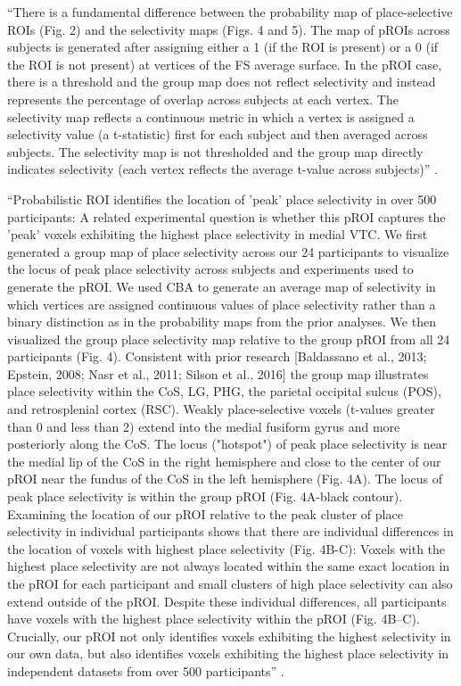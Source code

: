 ``There is a fundamental difference between the probability map of
place-selective ROIs (Fig. 2) and the selectivity maps (Figs.  4 and 5).
%
The map of pROIs across subjects is generated after assigning either a 1 (if the
ROI is present) or a 0 (if the ROI is not present) at vertices of the FS average
surface.
%
In the pROI case, there is a threshold and the group map does not reflect
selectivity and instead represents the percentage of overlap across subjects at
each vertex.
%
The selectivity map reflects a continuous metric in which a vertex is assigned a
selectivity value (a t-statistic) first for each subject and then averaged
across subjects.
%
The selectivity map is not thresholded and the group map directly indicates
selectivity (each vertex reflects the average t-value across subjects)''
\citep{weiner2018defining}.


``Probabilistic ROI identifies the location of 'peak' place selectivity in over
500 participants:
%
A related experimental question is whether this pROI captures the 'peak' voxels
exhibiting the highest place selectivity in medial VTC.
%
We first generated a group map of place selectivity across our 24 participants
to visualize the locus of peak place selectivity across subjects and experiments
used to generate the pROI.
%
We used CBA to generate an average map of selectivity in which vertices are
assigned continuous values of place selectivity rather than a binary distinction
as in the probability maps from the prior analyses.
%
We then visualized the group place selectivity map relative to the group pROI
from all 24 participants (Fig. 4).
%
Consistent with prior research [Baldassano et al., 2013; Epstein, 2008; Nasr et
al., 2011; Silson et al., 2016] the group map illustrates place selectivity
within the CoS, LG, PHG, the parietal occipital sulcus (POS), and retrosplenial
cortex (RSC).
%
Weakly place-selective voxels (t-values greater than 0 and less than 2) extend
into the medial fusiform gyrus and more posteriorly along the CoS.
%
The locus ("hotspot") of peak place selectivity is near the medial lip of the
CoS in the right hemisphere and close to the center of our pROI near the fundus
of the CoS in the left hemisphere (Fig. 4A).
%
The locus of peak place selectivity is within the group pROI (Fig. 4A-black
contour).
%
Examining the location of our pROI relative to the peak cluster of place
selectivity in individual participants shows that there are individual
differences in the location of voxels with highest place selectivity (Fig.
4B-C):
%
Voxels with the highest place selectivity are not always located within the same
exact location in the pROI for each participant and small clusters of high place
selectivity can also extend outside of the pROI.
%
Despite these individual differences, all participants have voxels with the
highest place selectivity within the pROI (Fig. 4B–C).
%
Crucially, our pROI not only identifies voxels exhibiting the highest
selectivity in our own data, but also identifies voxels exhibiting the highest
place selectivity in independent datasets from over 500 participants''
\citep{weiner2018defining}.


